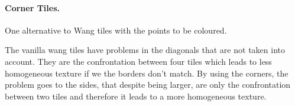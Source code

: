 \paragraph{Corner Tiles. \cite{LD06AWTCECC}} %
 \label{par:corner_tiles}
One alternative to Wang tiles with the points to be coloured.

The vanilla wang tiles have problems in the diagonals that are not taken into account. They are the confrontation between four tiles which leads to less homogeneous texture if we the borders don't match. By using the corners, the problem goes to the sides, that despite being larger, are only the confrontation between two tiles and therefore it leads to a more homogeneous texture.






